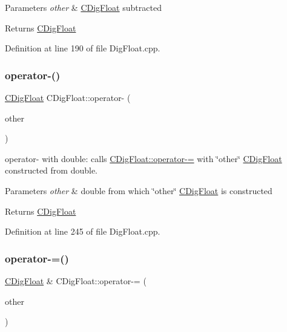 \begin{DoxyParams}{Parameters}
{\em other} & \hyperlink{classCDigFloat}{C\+Dig\+Float} subtracted \\
\hline
\end{DoxyParams}
\begin{DoxyReturn}{Returns}
\hyperlink{classCDigFloat}{C\+Dig\+Float} 
\end{DoxyReturn}


Definition at line 190 of file Dig\+Float.\+cpp.

\mbox{\label{classCDigFloat_ad873c5c22f0f18e89caf7309a043bfa0}} 
\subsubsection{\texorpdfstring{operator-\/()}{operator-()}\hspace{0.1cm}{\footnotesize\ttfamily [2/2]}}
{\footnotesize\ttfamily \hyperlink{classCDigFloat}{C\+Dig\+Float} C\+Dig\+Float\+::operator-\/ (\begin{DoxyParamCaption}\item[{const double}]{other }\end{DoxyParamCaption})}



operator-\/ with double\+: calls \hyperlink{classCDigFloat_a7496a4f8445815e9a346076c3d90305a}{C\+Dig\+Float\+::operator-\/=} with \char`\"{}other\char`\"{} \hyperlink{classCDigFloat}{C\+Dig\+Float} constructed from double. 


\begin{DoxyParams}{Parameters}
{\em other} & double from which \char`\"{}other\char`\"{} \hyperlink{classCDigFloat}{C\+Dig\+Float} is constructed \\
\hline
\end{DoxyParams}
\begin{DoxyReturn}{Returns}
\hyperlink{classCDigFloat}{C\+Dig\+Float} 
\end{DoxyReturn}


Definition at line 245 of file Dig\+Float.\+cpp.

\mbox{\label{classCDigFloat_a7496a4f8445815e9a346076c3d90305a}} 
\subsubsection{\texorpdfstring{operator-\/=()}{operator-=()}\hspace{0.1cm}{\footnotesize\ttfamily [1/2]}}
{\footnotesize\ttfamily \hyperlink{classCDigFloat}{C\+Dig\+Float} \& C\+Dig\+Float\+::operator-\/= (\begin{DoxyParamCaption}\item[{const \hyperlink{classCDigFloat}{C\+Dig\+Float} \&}]{other }\end{DoxyParamCaption})}



